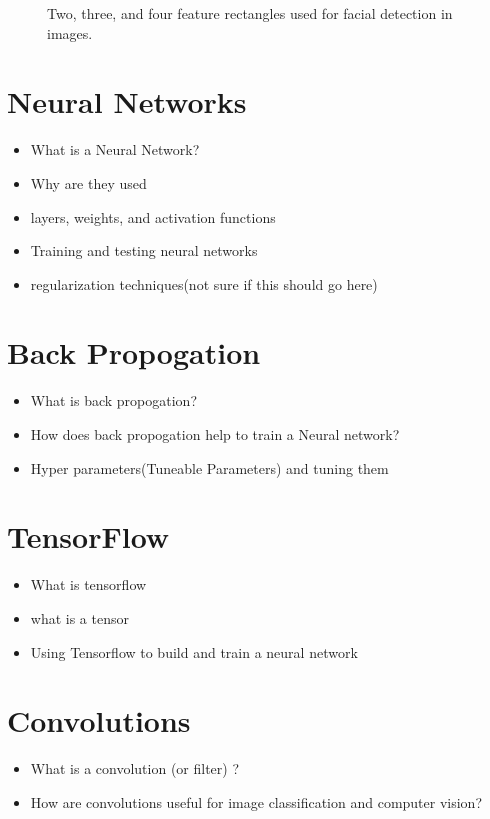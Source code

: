 \documentclass[12pt]{article} %
\begin{document}
	
\begin{figure}[h]
\caption{Two, three, and four feature rectangles used for facial detection in images.}\label{fig: 4}
\end{figure}
	
	
	
	 


\section{Neural Networks}
\begin{itemize}
\item What is a Neural Network?
\item Why are they used
\item layers, weights, and activation functions
\item Training and testing neural networks 
\item regularization techniques(not sure if this should go here)
\end{itemize}


\section{Back Propogation}
\begin{itemize}
\item What is back propogation?
\item How does back propogation help to train a Neural network?
\item Hyper parameters(Tuneable Parameters) and tuning them
\end{itemize}

\section{TensorFlow}
\begin{itemize}
\item What is tensorflow
\item what is a tensor
\item Using Tensorflow to build and train a neural network
\end{itemize}


\section{Convolutions}
\begin{itemize}
\item What is a convolution (or filter) ?
\item How are convolutions useful for image classification and computer vision?
\end{itemize}
\end{document}

